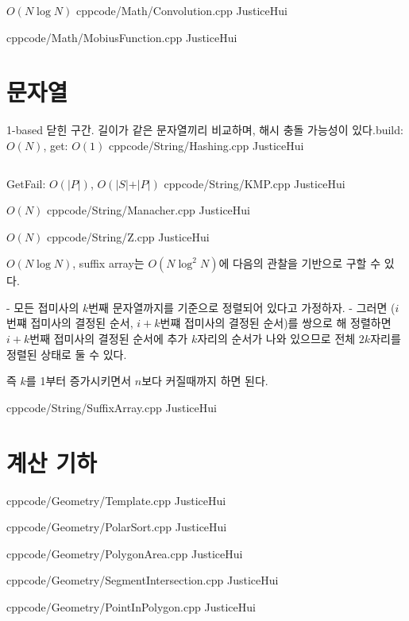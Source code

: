 \documentclass[landscape, 8pt, a4paper, twocolumn]{extarticle} %
\begin{document}
{}{$O(N \log N)$}
{cpp}{code/Math/Convolution.cpp}
{JusticeHui}

{}{}
{cpp}{code/Math/MobiusFunction.cpp}
{JusticeHui}

\section{문자열}

{1-based 닫힌 구간. 길이가 같은 문자열끼리 비교하며, 해시 충돌 가능성이 있다.}{build: $O(N)$, get: $O(1)$}
{cpp}{code/String/Hashing.cpp}
{JusticeHui}

\inputminted{cpp}{code/String/HashingExample.cpp}

{}{GetFail: $O(\vert P\vert)$, $O(\vert S\vert + \vert P\vert)$}
{cpp}{code/String/KMP.cpp}
{JusticeHui}

{}{$O(N)$}
{cpp}{code/String/Manacher.cpp}
{JusticeHui}

{}{$O(N)$}
{cpp}{code/String/Z.cpp}
{JusticeHui}

{}{$O(N \log N)$, suffix array는 $O(N \log^2N)$에 다음의 관찰을 기반으로 구할 수 있다.

- 모든 접미사의 $k$번째 문자열까지를 기준으로 정렬되어 있다고 가정하자.
- 그러면 ($i$번쨰 접미사의 결정된 순서, $i+k$번쨰 접미사의 결정된 순서)를 쌍으로 해 정렬하면 $i+k$번째 접미사의 결정된 순서에 추가 $k$자리의 순서가 나와 있으므로 전체 $2k$자리를 정렬된 상태로 둘 수 있다.

즉 $k$를 1부터 증가시키면서 $n$보다 커질때까지 하면 된다.
}
{cpp}{code/String/SuffixArray.cpp}
{JusticeHui}

\section{계산 기하}

{}{}
{cpp}{code/Geometry/Template.cpp}
{JusticeHui}

{}{}
{cpp}{code/Geometry/PolarSort.cpp}
{JusticeHui}

{}{}
{cpp}{code/Geometry/PolygonArea.cpp}
{JusticeHui}

{}{}
{cpp}{code/Geometry/SegmentIntersection.cpp}
{JusticeHui}

{}{}
{cpp}{code/Geometry/PointInPolygon.cpp}
{JusticeHui}
\end{document}
